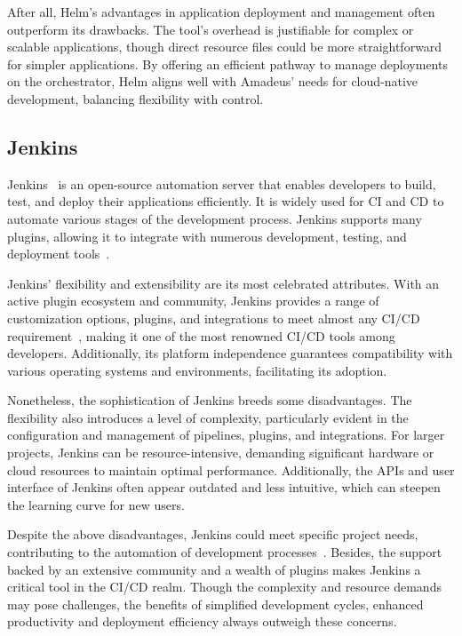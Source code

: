 After all, Helm's advantages in application deployment and management often outperform its drawbacks. The tool's overhead is justifiable for complex or scalable applications, though direct resource files could be more straightforward for simpler applications. By offering an efficient pathway to manage deployments on the orchestrator, Helm aligns well with Amadeus' needs for cloud-native development, balancing flexibility with control. 

\subsection{Jenkins}

Jenkins~\parencite{Jenkins} is an open-source automation server that enables developers to build, test, and deploy their applications efficiently. It is widely used for \ac{CI} and \ac{CD} to automate various stages of the development process. Jenkins supports many plugins, allowing it to integrate with numerous development, testing, and deployment tools~\parencite{armeniseContinuousDeliveryJenkins2015}. 

Jenkins' flexibility and extensibility are its most celebrated attributes. With an active plugin ecosystem and community, Jenkins provides a range of customization options, plugins, and integrations to meet almost any \ac{CI}/\ac{CD} requirement~\parencite{shahinContinuousIntegrationDelivery2017}, making it one of the most renowned \ac{CI}/\ac{CD} tools among developers. Additionally, its platform independence guarantees compatibility with various operating systems and environments, facilitating its adoption. 

Nonetheless, the sophistication of Jenkins breeds some disadvantages. The flexibility also introduces a level of complexity, particularly evident in the configuration and management of pipelines, plugins, and integrations. For larger projects, Jenkins can be resource-intensive, demanding significant hardware or cloud resources to maintain optimal performance. Additionally, the \ac{API}s and user interface of Jenkins often appear outdated and less intuitive, which can steepen the learning curve for new users. 

Despite the above disadvantages, Jenkins could meet specific project needs, contributing to the automation of development processes~\parencite{arachchiContinuousIntegrationContinuous2018}. Besides, the support backed by an extensive community and a wealth of plugins makes Jenkins a critical tool in the \ac{CI}/\ac{CD} realm. Though the complexity and resource demands may pose challenges, the benefits of simplified development cycles, enhanced productivity and deployment efficiency always outweigh these concerns. 

